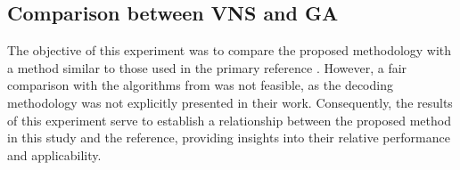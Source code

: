 \documentclass[sn-nature]{sn-jnl}%
\theoremstyle{thmstyleone}%
\theoremstyle{thmstyletwo}%
\theoremstyle{thmstylethree}%
\begin{document}

\subsection{Comparison between VNS and GA}

The objective of this experiment was to compare the proposed methodology with a method similar to those used in the primary reference \cite{rajabi2023utilizing}. However, a fair comparison with the algorithms from \cite{rajabi2023utilizing} was not feasible, as the decoding methodology was not explicitly presented in their work. Consequently, the results of this experiment serve to establish a relationship between the proposed method in this study and the reference, providing insights into their relative performance and applicability.
\end{document}
